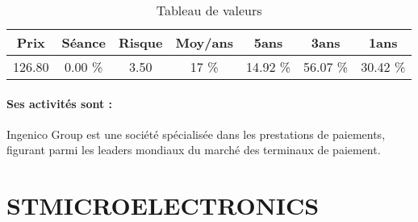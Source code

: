 \documentclass[11pt,a4paper]{report}%
\begin{document}
\begin{table}[H]
  \centering
    \begin{tabular}{|c|c|c|c|c|c|c|}
    \hline
    Prix & Séance & Risque  & Moy/ans & 5ans & 3ans & 1ans \\
    \hline
    126.80 &    0.00 \%    & 3.50 & 17 \% & 14.92 \% & 56.07 \% & 30.42 \% \\
    \hline
    \end{tabular}%
        \label{tab:table_INGENICO GROUP}%
      \caption{Tableau de valeurs}
\end{table}%

\paragraph{Ses activités sont : } Ingenico Group est une société spécialisée dans les prestations de paiements, figurant parmi les leaders mondiaux du marché des terminaux de paiement.  
    
    \newpage

\section{STMICROELECTRONICS}
\end{document}
